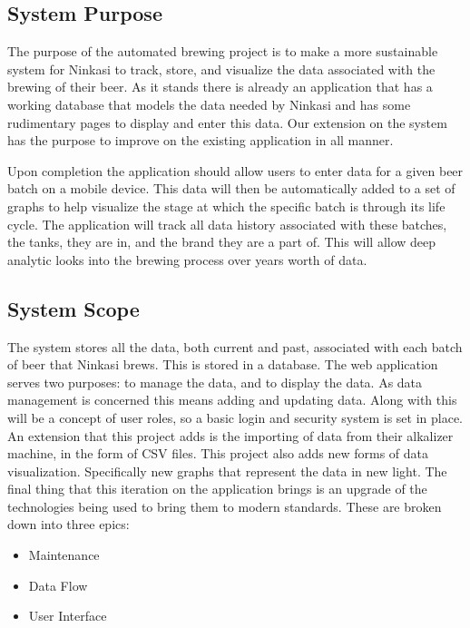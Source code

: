 \documentclass[draftclsnofoot,onecolumn,journal,letterpaper,compsoc,10pt]{IEEEtran}
\begin{document}
    \subsection{System Purpose}

    The purpose of the automated brewing project is to make a more sustainable system for Ninkasi to track, store, and visualize the data associated with the brewing of their beer.  As it stands there is already an application that has a working database that models the data needed by Ninkasi and has some rudimentary pages to display and enter this data.  Our extension on the system has the purpose to improve on the existing application in all manner.
    
    Upon completion the application should allow users to enter data for a given beer batch on a mobile device.  This data will then be automatically added to a set of graphs to help visualize the stage at which the specific batch is through its life cycle.  The application will track all data history associated with these batches, the tanks, they are in, and the brand they are a part of.  This will allow deep analytic looks into the brewing process over years worth of data.
    
    \subsection{System Scope}
    
    The system stores all the data, both current and past, associated with each batch of beer that Ninkasi brews.  This is stored in a database.  The web application serves two purposes: to manage the data, and to display the data.  As data management is concerned this means adding and updating data.  Along with this will be a concept of user roles, so a basic login and security system is set in place.  An extension that this project adds is the importing of data from their alkalizer machine, in the form of CSV files.  This project also adds new forms of data visualization.  Specifically new graphs that represent the data in new light.  The final thing that this iteration on the application brings is an upgrade of the technologies being used to bring them to modern standards.  These are broken down into three epics:
    
    \begin{itemize}
        \item Maintenance 
        \item Data Flow
        \item User Interface
    \end{itemize}
    
\end{document}
